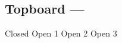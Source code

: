 \subsection[Topboard]{Topboard --- \UiKey{\I}\UiKey{\SET}}









































Closed
Open 1
Open 2
Open 3
